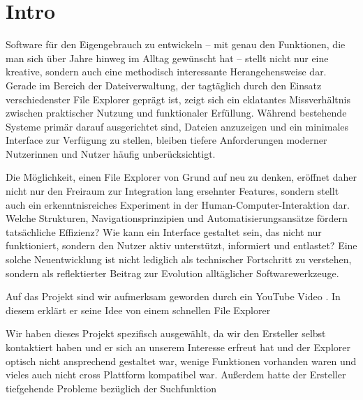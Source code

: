 \section{Intro} 
Software für den Eigengebrauch zu entwickeln – mit genau den Funktionen, die man sich über Jahre hinweg im Alltag
gewünscht hat – stellt nicht nur eine kreative, sondern auch eine methodisch interessante Herangehensweise dar. Gerade im Bereich
der Dateiverwaltung, der tagtäglich durch den Einsatz verschiedenster File Explorer geprägt ist, zeigt sich ein eklatantes
Missverhältnis zwischen praktischer Nutzung und funktionaler Erfüllung. Während bestehende Systeme primär darauf ausgerichtet
sind, Dateien anzuzeigen und ein minimales Interface zur Verfügung zu stellen, bleiben tiefere Anforderungen moderner Nutzerinnen
und Nutzer häufig unberücksichtigt.

Die Möglichkeit, einen File Explorer von Grund auf neu zu denken, eröffnet daher nicht nur den Freiraum zur Integration lang
ersehnter Features, sondern stellt auch ein erkenntnisreiches Experiment in der Human-Computer-Interaktion dar. Welche Strukturen,
Navigationsprinzipien und Automatisierungsansätze fördern tatsächliche Effizienz? Wie kann ein Interface gestaltet sein, das nicht
nur funktioniert, sondern den Nutzer aktiv unterstützt, informiert und entlastet? Eine solche Neuentwicklung ist nicht lediglich
als technischer Fortschritt zu verstehen, sondern als reflektierter Beitrag zur Evolution alltäglicher Softwarewerkzeuge.

Auf das Projekt sind wir aufmerksam geworden durch ein YouTube Video \cite{connaticus01}. In diesem erklärt er seine Idee von
einem schnellen File Explorer

Wir haben dieses Projekt spezifisch ausgewählt, da wir den Ersteller selbst kontaktiert haben und er sich an unserem Interesse
erfreut hat und der Explorer optisch nicht ansprechend gestaltet war, wenige Funktionen vorhanden waren und vieles auch nicht
cross Plattform kompatibel war. Außerdem hatte der Ersteller tiefgehende Probleme bezüglich der Suchfunktion 


